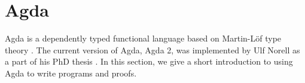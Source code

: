 \section{Agda}
Agda is a dependently typed functional language based on Martin-Löf type theory \cite{Martin-Löf}. The current version of Agda, Agda 2, was implemented by Ulf Norell as a part of his PhD thesis \cite{NorellAgda}.
In this section, we give a short introduction to using Agda to write programs and proofs.

